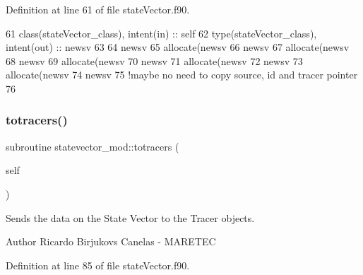 Definition at line 61 of file state\+Vector.\+f90.


\begin{DoxyCode}
61     \textcolor{keywordtype}{class}(stateVector\_class), \textcolor{keywordtype}{intent(in)} :: self
62     \textcolor{keywordtype}{type}(stateVector\_class), \textcolor{keywordtype}{intent(out)} :: newsv
63     
64     newsv%
65     \textcolor{keyword}{allocate}(newsv%
66     newsv%
67     \textcolor{keyword}{allocate}(newsv%
68     newsv%
69     \textcolor{keyword}{allocate}(newsv%
70     newsv%
71     \textcolor{keyword}{allocate}(newsv%
72     newsv%
73     \textcolor{keyword}{allocate}(newsv%
74     newsv%
75     \textcolor{comment}{!maybe no need to copy source, id and tracer pointer}
76     
\end{DoxyCode}
\mbox{\label{namespacestatevector__mod_af0831dbae02e8ec94c576224cae673e5}} 
\subsubsection{\texorpdfstring{totracers()}{totracers()}}
{\footnotesize\ttfamily subroutine statevector\+\_\+mod\+::totracers (\begin{DoxyParamCaption}\item[{class(\mbox{\hyperlink{structstatevector__mod_1_1statevector__class}{statevector\+\_\+class}}), intent(in)}]{self }\end{DoxyParamCaption})\hspace{0.3cm}{\ttfamily [private]}}



Sends the data on the State Vector to the Tracer objects. 

\begin{DoxyAuthor}{Author}
Ricardo Birjukovs Canelas -\/ M\+A\+R\+E\+T\+EC 
\end{DoxyAuthor}


Definition at line 85 of file state\+Vector.\+f90.


